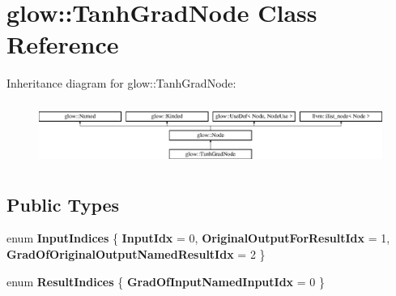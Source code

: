 \hypertarget{classglow_1_1_tanh_grad_node}{}\section{glow\+:\+:Tanh\+Grad\+Node Class Reference}
\label{classglow_1_1_tanh_grad_node}
Inheritance diagram for glow\+:\+:Tanh\+Grad\+Node\+:\begin{figure}[H]
\begin{center}
\leavevmode
\includegraphics[height=2.028986cm]{classglow_1_1_tanh_grad_node}
\end{center}
\end{figure}
\subsection*{Public Types}
\begin{DoxyCompactItemize}
\item 
\mbox{\label{classglow_1_1_tanh_grad_node_a70752511e7c06a076527ffaffbda598f}} 
enum {\bfseries Input\+Indices} \{ {\bfseries Input\+Idx} = 0, 
{\bfseries Original\+Output\+For\+Result\+Idx} = 1, 
{\bfseries Grad\+Of\+Original\+Output\+Named\+Result\+Idx} = 2
 \}
\item 
\mbox{\label{classglow_1_1_tanh_grad_node_a0acd3f46d31915a6ab0bf1aab65dc6a2}} 
enum {\bfseries Result\+Indices} \{ {\bfseries Grad\+Of\+Input\+Named\+Input\+Idx} = 0
 \}
\end{DoxyCompactItemize}
